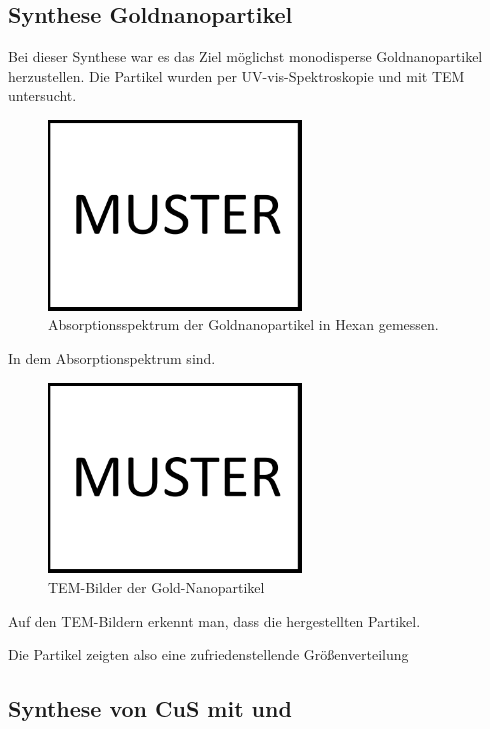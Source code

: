 \subsection{Synthese Goldnanopartikel}
	Bei dieser Synthese war es das Ziel möglichst monodisperse Goldnanopartikel herzustellen.
	Die Partikel wurden per UV-vis-Spektroskopie und mit TEM untersucht.
	
	\begin{figure}[H]
		\centering
		\includegraphics[width=0.6\textwidth]{Bilder/Muster} 	
		\caption{Absorptionsspektrum der Goldnanopartikel in Hexan gemessen.}
		\label{fig:UV-AuNP}
	\end{figure}
	
	In dem Absorptionspektrum sind. 
	
	\begin{figure}[H]
		\centering
		\includegraphics[width=0.6\textwidth]{Bilder/MUSTER} 	
		\caption{TEM-Bilder der Gold-Nanopartikel}
		\label{fig:TEM-AuNP}
	\end{figure}
	
	Auf den TEM-Bildern erkennt man, dass die hergestellten Partikel. 
	
	Die Partikel zeigten also eine zufriedenstellende Größenverteilung
	

	
	
\subsection{Synthese von CuS mit  und }

